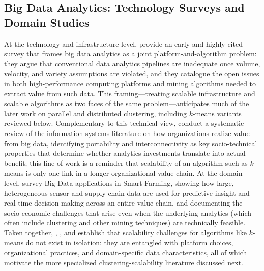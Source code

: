 \subsection{Big Data Analytics: Technology Surveys and Domain Studies}
At the technology-and-infrastructure level, \cite{tsai2015big} provide an early and highly cited survey that frames big data analytics as a joint platform-and-algorithm problem: they argue that conventional data analytics pipelines are inadequate once volume, velocity, and variety assumptions are violated, and they catalogue the open issues in both high-performance computing platforms and mining algorithms needed to extract value from such data. This framing---treating scalable infrastructure and scalable algorithms as two faces of the same problem---anticipates much of the later work on parallel and distributed clustering, including $k$-means variants reviewed below. Complementary to this technical view, \cite{gunther2017debating} conduct a systematic review of the information-systems literature on how organizations realize value from big data, identifying portability and interconnectivity as key socio-technical properties that determine whether analytics investments translate into actual benefit; this line of work is a reminder that scalability of an algorithm such as $k$-means is only one link in a longer organizational value chain. At the domain level, \cite{wolfert2017big} survey Big Data applications in Smart Farming, showing how large, heterogeneous sensor and supply-chain data are used for predictive insight and real-time decision-making across an entire value chain, and documenting the socio-economic challenges that arise even when the underlying analytics (which often include clustering and other mining techniques) are technically feasible. Taken together, \cite{tsai2015big}, \cite{gunther2017debating}, and \cite{wolfert2017big} establish that scalability challenges for algorithms like $k$-means do not exist in isolation: they are entangled with platform choices, organizational practices, and domain-specific data characteristics, all of which motivate the more specialized clustering-scalability literature discussed next.

